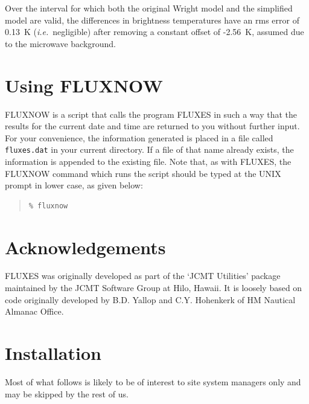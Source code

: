 \documentclass[11pt,twoside]{article}
\newenvironment{myquote}{\begin{quote}\begin{small}}{\end{small}\end{quote}}
\newcommand{\htmladdnormallink}[2]{#1}
\newcommand{\xlabel}[1]{}
\renewcommand{\_}{\texttt{\symbol{95}}}
\begin{document}
Over the interval for which
both the original Wright model and the simplified model are valid, the
differences in brightness temperatures have an rms error of 0.13~K
({\em i.e.}\ negligible) after removing a constant offset of -2.56~K, assumed
due to the microwave background.

\section{Using FLUXNOW}
\xlabel{FLUXNOW}
\label{sec:fluxnow}


FLUXNOW is a script that calls the program FLUXES in such a way that
the results for the current date and time are returned to you without
further input.  For your convenience, the information generated is
placed in a file called {\tt{fluxes.dat}} in your current directory.
If a file of that name already exists, the information is appended to
the existing file.  Note that, as with FLUXES, the FLUXNOW command
which runs the script should be typed at the UNIX prompt in lower case,
as given below:

\begin{myquote}
\begin{verbatim}
% fluxnow
\end{verbatim}
\end{myquote}

\section{Acknowledgements}
\xlabel{ACKNOWLEDGEMENTS}
\label{sec:acknowledgements}

FLUXES was originally developed as part of the
`\htmladdnormallink{JCMT}{http://www.jach.hawaii.edu/JCMT/home.html} Utilities'
package maintained by the \htmladdnormallink{JCMT Software Group}
{http://www.jach.hawaii.edu/jcmt_sw/} at Hilo, Hawaii. It is
loosely based on code originally developed by B.D. Yallop and C.Y. Hohenkerk
of \htmladdnormallink{HM Nautical Almanac Office}{http://www.ast.cam.ac.uk/}.

\clearpage

\appendix
\section{Installation}
\xlabel{INSTALLATION}
\label{sec:installation}

Most of what follows is likely to be of interest to site system managers only
and may be skipped by the rest of us.
\end{document}
